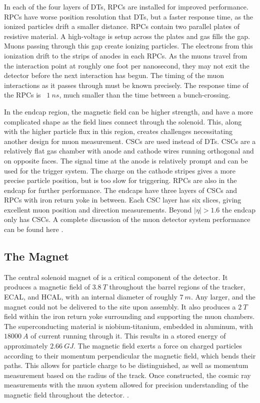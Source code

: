 In each of the four layers of DTs, RPCs are installed for improved performance.  RPCs have worse position resolution that DTs, but a faster response time, as the ionized particles drift a smaller distance.  RPCs contain two parallel plates of resistive material.  A high-voltage is setup across the plates and gas fills the gap.  Muons passing through this gap create ionizing particles.  The electrons from this ionization drift to the strips of anodes in each RPCs.  As the muons travel from the interaction point at roughly one foot per nanosecond, they may not exit the detector before the next interaction has begun.  The timing of the muon interactions as it passes through must be known precisely.  The response time of the RPCs is ~\ensuremath{\SI{1}{ns}}, much smaller than the time between a bunch-crossing.

In the endcap region, the magnetic field can be higher strength, and have a more complicated shape as the field lines connect through the solenoid. This, along with the higher particle flux in this region, creates challenges necessitating another design for muon measurement. CSCs are used instead of DTs. CSCs are a relatively flat gas chamber with anode and cathode wires running orthogonal and on opposite faces. The signal time at the anode is relatively prompt and can be used for the \CMS trigger system. The charge on the cathode stripes gives a more precise particle position, but is too slow for triggering. RPCs are also in the endcap for further performance. The endcaps have three layers of CSCs and RPCs with iron return yoke in between. Each CSC layer has six slices, giving excellent muon position and direction measurements.  Beyond \ensuremath{|\eta| > 1.6} the endcap only has CSCs. A complete discussion of the muon detector system performance can be found here \cite{muonDPG13TeV}.

\subsection{The Magnet}
The central solenoid magnet of \CMS is a critical component of the detector. It produces a magnetic field of \ensuremath{\SI{3.8}{T}} throughout the barrel regions of the tracker, ECAL, and HCAL, with an internal diameter of roughly \ensuremath{\SI{7}{m}}. Any larger, and the magnet could not be delivered to the \CMS site upon assembly. It also produces a \ensuremath{\SI{2}{T}} field within the iron return yoke surrounding and supporting the muon chambers. The superconducting material is niobium-titanium, embedded in aluminum, with \ensuremath{\SI{18000}{A}} of current running through it. This results in a stored energy of approximately \ensuremath{\SI{2.66}{GJ}}. The magnetic field exerts a force on charged particles according to their momentum perpendicular the magnetic field, which bends their paths. This allows for particle charge to be distinguished, as well as momentum measurement based on the radius of the track.  Once constructed, the cosmic ray measurements with the muon system allowed for precision understanding of the magnetic field throughout the detector.  \cite{magnet}.


